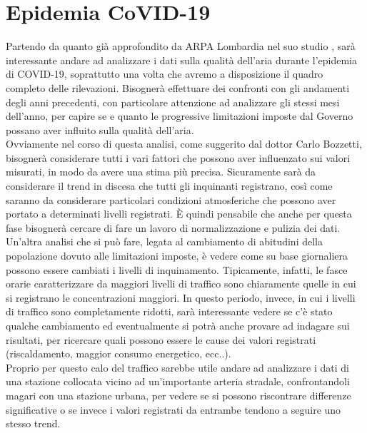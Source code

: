 \documentclass{article}
\begin{document}
\section{Epidemia CoVID-19}
Partendo da quanto già approfondito da ARPA Lombardia nel suo studio \cite{arpaCovid}, sarà interessante andare ad analizzare i dati sulla qualità dell'aria durante l'epidemia di COVID-19, soprattutto una volta che avremo a disposizione il quadro completo delle rilevazioni. Bisognerà effettuare dei confronti con gli andamenti degli anni precedenti, con particolare attenzione ad analizzare gli stessi mesi dell'anno, per capire se e quanto le progressive limitazioni imposte dal Governo possano aver influito sulla qualità dell'aria.
\\Ovviamente nel corso di questa analisi, come suggerito dal dottor Carlo Bozzetti, bisognerà considerare tutti i vari fattori che possono aver influenzato sui valori misurati, in modo da avere una stima più precisa. Sicuramente sarà da considerare il trend in discesa che tutti gli inquinanti registrano, così come saranno da considerare particolari condizioni atmosferiche che possono aver portato a determinati livelli registrati. È quindi pensabile che anche per questa fase bisognerà cercare di fare un lavoro di normalizzazione e pulizia dei dati.
\\Un'altra analisi che si può fare, legata al cambiamento di abitudini della popolazione dovuto alle limitazioni imposte, è vedere come su base giornaliera possono essere cambiati i livelli di inquinamento. Tipicamente, infatti, le fasce orarie caratterizzare da maggiori livelli di traffico sono chiaramente quelle in cui si registrano le concentrazioni maggiori. In questo periodo, invece, in cui i livelli di traffico sono completamente ridotti, sarà interessante vedere se c'è stato qualche cambiamento ed eventualmente si potrà anche provare ad indagare sui risultati, per ricercare quali possono essere le cause dei valori registrati (riscaldamento, maggior consumo energetico, ecc..).
\\Proprio per questo calo del traffico sarebbe utile andare ad analizzare i dati di una stazione collocata vicino ad un'importante arteria stradale, confrontandoli magari con una stazione urbana, per vedere se si possono riscontrare differenze significative o se invece i valori registrati da entrambe tendono a seguire uno stesso trend.
\newpage
\end{document}
